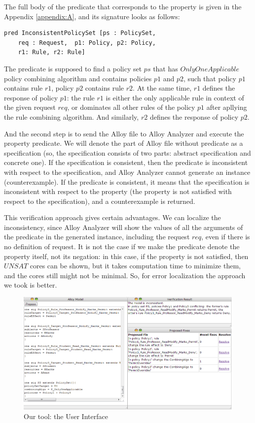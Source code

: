 \documentclass[letterpaper]{acm_proc_article-sp}
\begin{document}
The full body of the predicate that corresponds to the property is given in the Appendix \ref{appendix:A}, and its signature looks as follows:	

\begin{verbatim}
pred InconsistentPolicySet [ps : PolicySet, 
    req : Request,  p1: Policy, p2: Policy, 
    r1: Rule, r2: Rule]
\end{verbatim}

The predicate is supposed to find a policy set $ps$ that has $OnlyOneApplicable$ policy combining algorithm and contains policies $p1$ and $p2$, such that policy $p1$ contains rule $r1$, policy $p2$ contains rule $r2$. At the same time, $r1$ defines the response of policy $p1$: the rule $ r1$ is either the only applicable rule in context of the given request $req$, or dominates all other rules of the policy $p1$ after apllying the rule combining algorithm. And similarly, $r2$ defines the response of policy $p2$.

And the second step is to send the Alloy file to Alloy Analyzer and execute the property predicate. We will denote the part of Alloy file without predicate as a specification (so, the specification consists of two parts: abstract specification and concrete one). If the specification is consistent, then the predicate is inconsistent with respect to the specification, and Alloy Analyzer cannot generate an instance (counterexample). If the predicate is consistent, it means that the specification is inconsistent with respect to the property (the property is not satisfied with respect to the specification), and a counterexample is returned.

This verification approach gives certain advantages. We can localize the inconsistency, since Alloy Analyzer will show the values of all the arguments of the predicate in the generated instance, including the request $req$, even if there is no definition of request. It is not the case if we make the predicate denote the property itself, not its negation: in this case, if the property is not satisfied, then $UNSAT$ cores can be shown, but it takes computation time to minimize them, and the cores still might not be minimal. So, for error localization the approach we took is better.

\begin{figure}[ht]
\includegraphics[width=\textwidth]{tool.png}
\caption{Our tool: the User Interface}    
  \label{fig:tool}
\end{figure}
\end{document}
